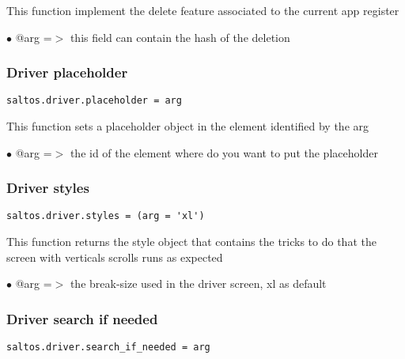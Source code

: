 \documentclass[a4paper]{article}
\begin{document}
This function implement the delete feature associated to the current app register

\begin{compactitem}
\item[\color{myblue}$\bullet$] @arg =$>$ this field can contain the hash of the deletion
\end{compactitem}

\hypertarget{toc735}{}
\subsubsection{Driver placeholder}

\begin{lstlisting}
saltos.driver.placeholder = arg
\end{lstlisting}

This function sets a placeholder object in the element identified by the arg

\begin{compactitem}
\item[\color{myblue}$\bullet$] @arg =$>$ the id of the element where do you want to put the placeholder
\end{compactitem}

\hypertarget{toc736}{}
\subsubsection{Driver styles}

\begin{lstlisting}
saltos.driver.styles = (arg = 'xl')
\end{lstlisting}

This function returns the style object that contains the tricks to do
that the screen with verticals scrolls runs as expected

\begin{compactitem}
\item[\color{myblue}$\bullet$] @arg =$>$ the break-size used in the driver screen, xl as default
\end{compactitem}

\hypertarget{toc737}{}
\subsubsection{Driver search if needed}

\begin{lstlisting}
saltos.driver.search_if_needed = arg
\end{lstlisting}
\end{document}
